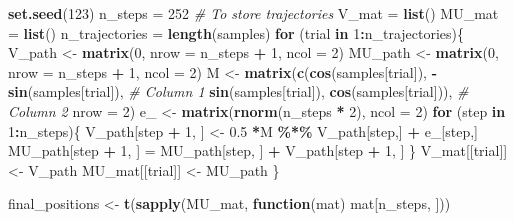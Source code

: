 \documentclass[12pt,halfline,a4paper,]{ouparticle}
\newenvironment{Shaded}{\begin{snugshade}}{\end{snugshade}}
\newcommand{\AttributeTok}[1]{\textcolor[rgb]{0.13,0.29,0.53}{#1}}
\newcommand{\CommentTok}[1]{\textcolor[rgb]{0.56,0.35,0.01}{\textit{#1}}}
\newcommand{\ControlFlowTok}[1]{\textcolor[rgb]{0.13,0.29,0.53}{\textbf{#1}}}
\newcommand{\DecValTok}[1]{\textcolor[rgb]{0.00,0.00,0.81}{#1}}
\newcommand{\FloatTok}[1]{\textcolor[rgb]{0.00,0.00,0.81}{#1}}
\newcommand{\FunctionTok}[1]{\textcolor[rgb]{0.13,0.29,0.53}{\textbf{#1}}}
\newcommand{\NormalTok}[1]{#1}
\newcommand{\OtherTok}[1]{\textcolor[rgb]{0.56,0.35,0.01}{#1}}
\newcommand{\SpecialCharTok}[1]{\textcolor[rgb]{0.81,0.36,0.00}{\textbf{#1}}}
\begin{document}
\begin{Shaded}
\begin{Highlighting}[]
\FunctionTok{set.seed}\NormalTok{(}\DecValTok{123}\NormalTok{)}
\NormalTok{n\_steps }\OtherTok{=} \DecValTok{252}
\CommentTok{\# To store trajectories}
\NormalTok{V\_mat }\OtherTok{=} \FunctionTok{list}\NormalTok{()}
\NormalTok{MU\_mat }\OtherTok{=} \FunctionTok{list}\NormalTok{()}
\NormalTok{n\_trajectories }\OtherTok{=} \FunctionTok{length}\NormalTok{(samples)}
\ControlFlowTok{for}\NormalTok{ (trial }\ControlFlowTok{in} \DecValTok{1}\SpecialCharTok{:}\NormalTok{n\_trajectories)\{}
\NormalTok{  V\_path }\OtherTok{\textless{}{-}} \FunctionTok{matrix}\NormalTok{(}\DecValTok{0}\NormalTok{, }\AttributeTok{nrow =}\NormalTok{ n\_steps }\SpecialCharTok{+} \DecValTok{1}\NormalTok{, }\AttributeTok{ncol =} \DecValTok{2}\NormalTok{)}
\NormalTok{  MU\_path }\OtherTok{\textless{}{-}} \FunctionTok{matrix}\NormalTok{(}\DecValTok{0}\NormalTok{, }\AttributeTok{nrow =}\NormalTok{ n\_steps }\SpecialCharTok{+} \DecValTok{1}\NormalTok{, }\AttributeTok{ncol =} \DecValTok{2}\NormalTok{)}
\NormalTok{  M }\OtherTok{\textless{}{-}} \FunctionTok{matrix}\NormalTok{(}\FunctionTok{c}\NormalTok{(}\FunctionTok{cos}\NormalTok{(samples[trial]), }\SpecialCharTok{{-}}\FunctionTok{sin}\NormalTok{(samples[trial]),  }\CommentTok{\# Column 1}
                \FunctionTok{sin}\NormalTok{(samples[trial]),  }\FunctionTok{cos}\NormalTok{(samples[trial])),  }\CommentTok{\# Column 2}
              \AttributeTok{nrow =} \DecValTok{2}\NormalTok{)}
\NormalTok{  e\_ }\OtherTok{\textless{}{-}} \FunctionTok{matrix}\NormalTok{(}\FunctionTok{rnorm}\NormalTok{(n\_steps }\SpecialCharTok{*} \DecValTok{2}\NormalTok{), }\AttributeTok{ncol =} \DecValTok{2}\NormalTok{)}
  \ControlFlowTok{for}\NormalTok{ (step }\ControlFlowTok{in} \DecValTok{1}\SpecialCharTok{:}\NormalTok{n\_steps)\{}
\NormalTok{    V\_path[step }\SpecialCharTok{+} \DecValTok{1}\NormalTok{, ] }\OtherTok{\textless{}{-}}  \FloatTok{0.5} \SpecialCharTok{*}\NormalTok{M }\SpecialCharTok{\%*\%}\NormalTok{ V\_path[step,] }\SpecialCharTok{+}\NormalTok{ e\_[step,]}
\NormalTok{    MU\_path[step }\SpecialCharTok{+} \DecValTok{1}\NormalTok{, ] }\OtherTok{=}\NormalTok{ MU\_path[step, ] }\SpecialCharTok{+}\NormalTok{ V\_path[step }\SpecialCharTok{+} \DecValTok{1}\NormalTok{, ]}
\NormalTok{  \}}
\NormalTok{  V\_mat[[trial]] }\OtherTok{\textless{}{-}}\NormalTok{ V\_path}
\NormalTok{  MU\_mat[[trial]] }\OtherTok{\textless{}{-}}\NormalTok{ MU\_path}
\NormalTok{\}}

\NormalTok{final\_positions }\OtherTok{\textless{}{-}} \FunctionTok{t}\NormalTok{(}\FunctionTok{sapply}\NormalTok{(MU\_mat, }\ControlFlowTok{function}\NormalTok{(mat) mat[n\_steps, ]))}


\end{Highlighting}
\end{Shaded}
\end{document}

